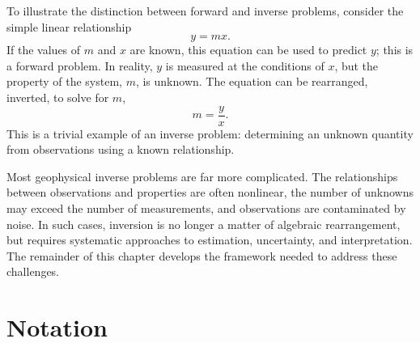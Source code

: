 To illustrate the distinction between forward and inverse problems, consider the simple linear relationship
\[
    y = mx .
\]
If the values of $m$ and $x$ are known, this equation can be used to predict $y$; this is a forward problem. In reality, $y$ is measured at the conditions of $x$, but the property of the system, $m$, is unknown.  The equation can be rearranged, inverted, to solve for $m$,
\[
    m = \frac{y}{x} .
\]
This is a trivial example of an inverse problem: determining an unknown quantity from observations using a known relationship.

Most geophysical inverse problems are far more complicated. The relationships between observations and properties are often nonlinear, the number of unknowns may exceed the number of measurements, and observations are contaminated by noise. In such cases, inversion is no longer a matter of algebraic rearrangement, but requires systematic approaches to estimation, uncertainty, and interpretation. The remainder of this chapter develops the framework needed to address these challenges.

\section{Notation}

